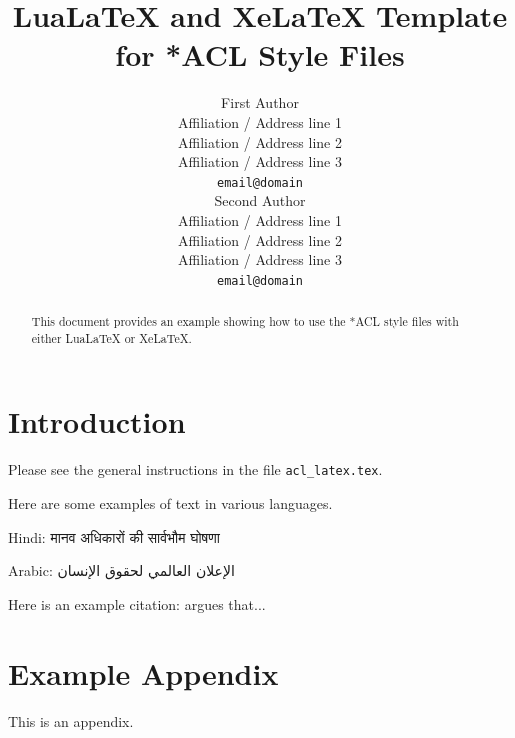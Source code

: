 \documentclass[11pt]{article}
\title{LuaLaTeX and XeLaTeX Template for *ACL Style Files}
\author{First Author \\
  Affiliation / Address line 1 \\
  Affiliation / Address line 2 \\
  Affiliation / Address line 3 \\
  \texttt{email@domain} \\\And
  Second Author \\
  Affiliation / Address line 1 \\
  Affiliation / Address line 2 \\
  Affiliation / Address line 3 \\
  \texttt{email@domain} \\}
\begin{document}
\maketitle
\begin{abstract}
This document provides an example showing how
to use the *ACL style files with either
LuaLaTeX or XeLaTeX.
\end{abstract}


\section{Introduction}

Please see the general instructions
in the file \verb|acl_latex.tex|.

Here are some examples of text in various languages.

Hindi: \foreignlanguage{hindi}{मानव अधिकारों की सार्वभौम घोषणा}

Arabic: \foreignlanguage{arabic}{الإعلان العالمي لحقوق الإنسان}

Here is an example citation:
\citet{Gusfield:97} argues that...




\appendix

\section{Example Appendix}
\label{sec:appendix}

This is an appendix.
\end{document}
